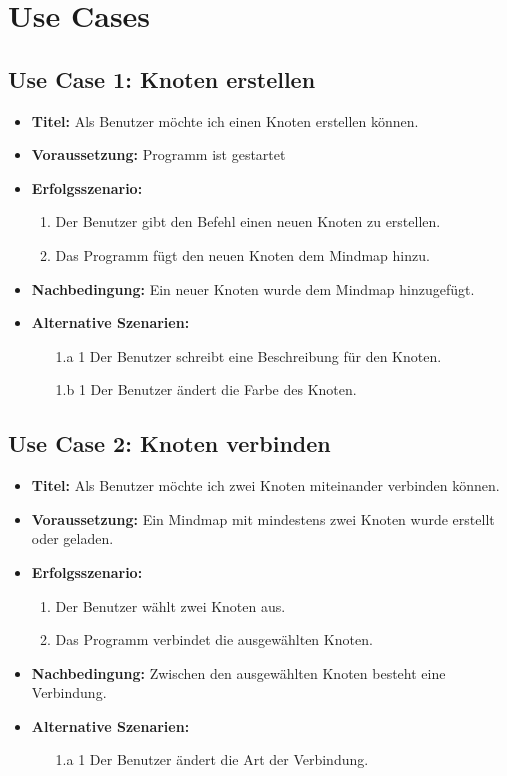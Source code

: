 \chapter{Use Cases}
\label{chap:use_cases}

\section*{Use Case 1: Knoten erstellen}
\begin{itemize}
\item \textbf{Titel:} Als Benutzer möchte ich einen Knoten erstellen können.
\item \textbf{Voraussetzung:} Programm ist gestartet
\item \textbf{Erfolgsszenario:}
	\begin{enumerate}
	\item Der Benutzer gibt den Befehl einen neuen Knoten zu erstellen.
	\item Das Programm fügt den neuen Knoten dem Mindmap hinzu.
	\end{enumerate}
\item \textbf{Nachbedingung:} Ein neuer Knoten wurde dem Mindmap hinzugefügt.
\item \textbf{Alternative Szenarien:}
	\begin{enumerate}
	\item [1.a 1] Der Benutzer schreibt eine Beschreibung für den Knoten.
	\item []
	\item [1.b 1] Der Benutzer ändert die Farbe des Knoten.
	\end{enumerate}
\end{itemize}

\section*{Use Case 2: Knoten verbinden}
\begin{itemize}
\item \textbf{Titel:} Als Benutzer möchte ich zwei Knoten miteinander verbinden können.
\item \textbf{Voraussetzung:} Ein Mindmap mit mindestens zwei Knoten wurde erstellt oder geladen.
\item \textbf{Erfolgsszenario:}
	\begin{enumerate}
	\item Der Benutzer wählt zwei Knoten aus.
	\item Das Programm verbindet die ausgewählten Knoten.
	\end{enumerate}
\item \textbf{Nachbedingung:} Zwischen den ausgewählten Knoten besteht eine Verbindung.
\item \textbf{Alternative Szenarien:}
	\begin{enumerate}
	\item [1.a 1] Der Benutzer ändert die Art der Verbindung.
	\end{enumerate}
\end{itemize}

